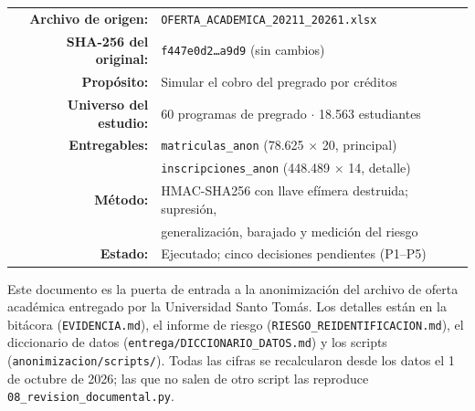 \documentclass[11pt,a4paper,twoside,twocolumn]{article}
\newcommand{\cod}[1]{\nolinkurl{#1}}
\begin{document}
\begin{titlepage}
\begin{tabular}{rl}
\textbf{Archivo de origen:} & \cod{OFERTA_ACADEMICA_20211_20261.xlsx} \\
\textbf{SHA-256 del original:} & \texttt{f447e0d2\ldots a9d9} (sin cambios) \\
\textbf{Propósito:} & Simular el cobro del pregrado por créditos \\
\textbf{Universo del estudio:} & 60 programas de pregrado $\cdot$ 18.563 estudiantes \\
\textbf{Entregables:} & \cod{matriculas_anon} (78.625 $\times$ 20, principal) \\
                     & \cod{inscripciones_anon} (448.489 $\times$ 14, detalle) \\
\textbf{Método:} & HMAC-SHA256 con llave efímera destruida; supresión, \\
                 & generalización, barajado y medición del riesgo \\
\textbf{Estado:} & Ejecutado; cinco decisiones pendientes (P1--P5) \\
\end{tabular}

\vfill
{\footnotesize Este documento es la puerta de entrada a la anonimización del archivo de oferta
académica entregado por la Universidad Santo Tomás. Los detalles están en la bitácora
(\cod{EVIDENCIA.md}), el informe de riesgo (\cod{RIESGO_REIDENTIFICACION.md}), el diccionario de
datos (\cod{entrega/DICCIONARIO_DATOS.md}) y los scripts (\cod{anonimizacion/scripts/}). Todas las
cifras se recalcularon desde los datos el 1 de octubre de 2026; las que no salen de otro script
las reproduce \cod{08_revision_documental.py}.}\\[1.4cm]
\end{titlepage}

\begingroup
\setlength{\parskip}{0pt}
\linespread{0.94}\selectfont
\tableofcontents
\endgroup

\newpage

\twocolumn
\end{document}
